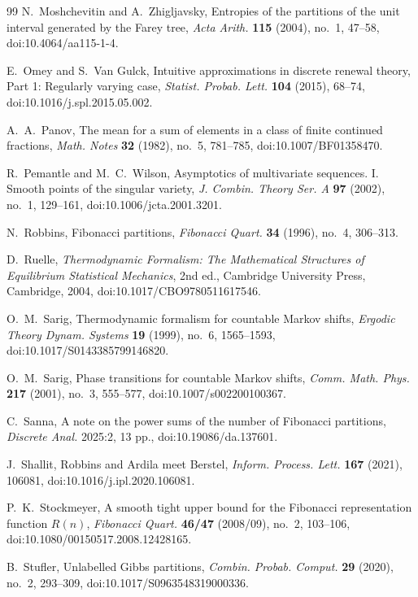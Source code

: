 \begin{thebibliography}{99}
N.~Moshchevitin and A.~Zhigljavsky,
Entropies of the partitions of the unit interval generated by the Farey tree,
\textit{Acta Arith.} \textbf{115} (2004), no.~1, 47--58,
doi:10.4064/aa115-1-4.

E.~Omey and S.~Van Gulck,
Intuitive approximations in discrete renewal theory, Part 1: Regularly
varying case,
\textit{Statist. Probab. Lett.} \textbf{104} (2015), 68--74,
doi:10.1016/j.spl.2015.05.002.

A.~A.~Panov,
The mean for a sum of elements in a class of finite continued fractions,
\textit{Math. Notes} \textbf{32} (1982), no.~5, 781--785,
doi:10.1007/BF01358470.

R.~Pemantle and M.~C.~Wilson,
Asymptotics of multivariate sequences. I. Smooth points of the singular
variety,
\textit{J. Combin. Theory Ser. A} \textbf{97} (2002), no.~1, 129--161,
doi:10.1006/jcta.2001.3201.

N.~Robbins,
Fibonacci partitions,
\textit{Fibonacci Quart.} \textbf{34} (1996), no.~4, 306--313.

D.~Ruelle,
\textit{Thermodynamic Formalism: The Mathematical Structures of Equilibrium
Statistical Mechanics},
2nd ed., Cambridge University Press, Cambridge, 2004,
doi:10.1017/CBO9780511617546.

O.~M.~Sarig,
Thermodynamic formalism for countable Markov shifts,
\textit{Ergodic Theory Dynam. Systems} \textbf{19} (1999), no.~6, 1565--1593,
doi:10.1017/S0143385799146820.

O.~M.~Sarig,
Phase transitions for countable Markov shifts,
\textit{Comm. Math. Phys.} \textbf{217} (2001), no.~3, 555--577,
doi:10.1007/s002200100367.

C.~Sanna,
A note on the power sums of the number of Fibonacci partitions,
\textit{Discrete Anal.} 2025:2, 13 pp.,
doi:10.19086/da.137601.

J.~Shallit,
Robbins and Ardila meet Berstel,
\textit{Inform. Process. Lett.} \textbf{167} (2021), 106081,
doi:10.1016/j.ipl.2020.106081.

P.~K.~Stockmeyer,
A smooth tight upper bound for the Fibonacci representation function \(R(n)\),
\textit{Fibonacci Quart.} \textbf{46/47} (2008/09), no.~2, 103--106,
doi:10.1080/00150517.2008.12428165.

B.~Stufler,
Unlabelled Gibbs partitions,
\textit{Combin. Probab. Comput.} \textbf{29} (2020), no.~2, 293--309,
doi:10.1017/S0963548319000336.


\end{thebibliography}
